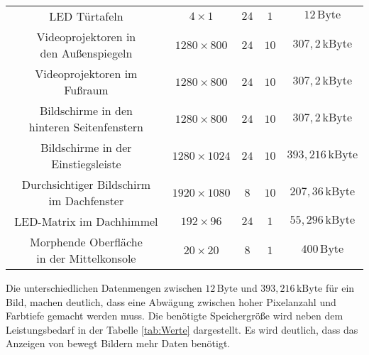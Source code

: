 \begin{table}[hbt]
\begin{tabular}{c|cccc}
		\parbox[t]{0.3\linewidth}{\centering LED Türtafeln} & $ 4 \times 1 $ & $ 24 $ & $ 1 $ &  $ 12\,\mathrm{Byte} $ \\
		\parbox[t]{0.3\linewidth}{\centering Videoprojektoren in\\den Außenspiegeln} & $ 1280 \times 800 $ & $ 24 $ & $ 10 $ &   $ 307,2\,\mathrm{kByte} $ \\ 
		\parbox[t]{0.3\linewidth}{\centering Videoprojektoren im Fußraum} & $ 1280 \times 800 $ & $ 24 $ & $ 10 $ & $ 307,2\,\mathrm{kByte} $ \\
		\parbox[t]{0.3\linewidth}{\centering Bildschirme in den\\hinteren Seitenfenstern} & $ 1280 \times 800 $ & $ 24 $ & $ 10 $ & $ 307,2\,\mathrm{kByte} $ \\
		\parbox[t]{0.3\linewidth}{\centering Bildschirme in der Einstiegsleiste} &  $ 1280 \times 1024 $ & $ 24 $ & $ 10 $ & $ 393,216\,\mathrm{kByte} $ \\
		\parbox[t]{0.3\linewidth}{\centering Durchsichtiger Bildschirm\\im Dachfenster} & $ 1920 \times 1080 $ & $ 8 $ & $ 10 $ & $ 207,36\,\mathrm{kByte} $ \\
		\parbox[t]{0.3\linewidth}{\centering LED-Matrix im Dachhimmel} & $ 192 \times 96 $ & $ 24 $ & $ 1 $ & $ 55,296\,\mathrm{kByte} $ \\
		\parbox[t]{0.3\linewidth}{\centering Morphende Oberfläche\\in der Mittelkonsole} & $ 20 \times 20 $ & $ 8 $ & $ 1 $ & $ 400\,\mathrm{Byte} $ \\
	\end{tabular} 
\end{table}
Die unterschiedlichen Datenmengen zwischen $ 12\,\mathrm{Byte} $ und $ 393,216\,\mathrm{kByte} $ für ein Bild, machen deutlich, dass eine Abwägung zwischen hoher Pixelanzahl und Farbtiefe gemacht werden muss. Die benötigte Speichergröße wird neben dem Leistungsbedarf in der Tabelle \ref{tab:Werte} dargestellt. Es wird deutlich, dass das Anzeigen von bewegt Bildern mehr Daten benötigt.
